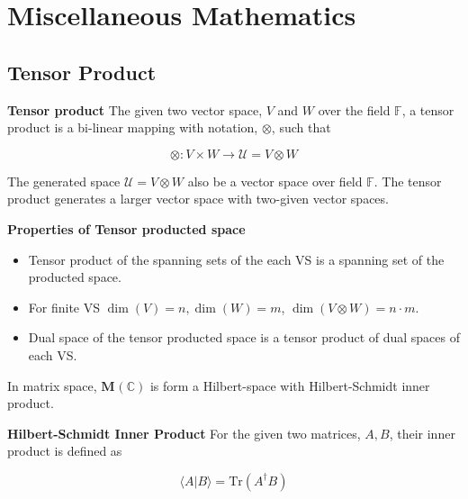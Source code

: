 \chapter{Miscellaneous Mathematics}

\section{Tensor Product}

\begin{definition}{\textbf{Tensor product}}
    The given two vector space, $V$ and $W$ over the field $\mathbb{F}$,
    a tensor product is a bi-linear mapping with notation, $\otimes$, such that

    \begin{equation}
        \otimes: V \times W \rightarrow \mathcal{U} = V \otimes W
    \end{equation}
\end{definition}

The generated space $\mathcal{U} = V \otimes W$ also be a 
vector space over field $\mathbb{F}$. The tensor product generates a larger vector space 
with two-given vector spaces. 

\begin{theorem}{\textbf{Properties of Tensor producted space}}

    \begin{itemize}
        \item Tensor product of the spanning sets of the each VS is a spanning set of the producted space.
        \item For finite VS $\dim(V) = n, \dim(W) = m$, $\dim(V \otimes W) = n \cdot m$.
        \item Dual space of the tensor producted space is a tensor product of dual spaces of each VS.
    \end{itemize}
\end{theorem}

In matrix space, $\mathbf{M}_{}(\mathbb{C})$ is form a Hilbert-space with Hilbert-Schmidt inner product.

\begin{definition}{\textbf{Hilbert-Schmidt Inner Product}}
    For the given two matrices, $A, B$, their inner product is defined as 

    \begin{equation}
        \langle A | B \rangle = \mbox{Tr}(A^\dagger B)
    \end{equation}
    
\end{definition}

